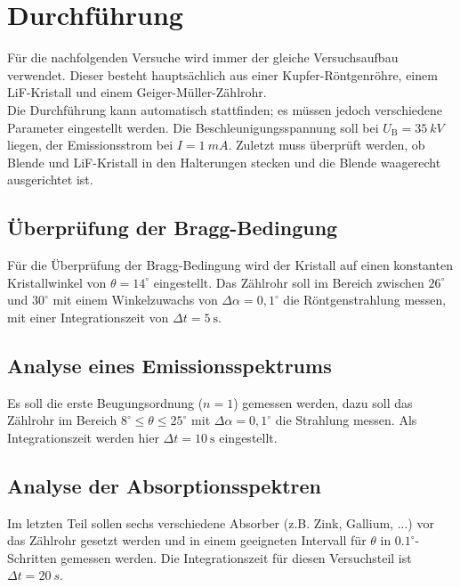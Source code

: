 \section{Durchführung}
\label{sec:Durchführung}
Für die nachfolgenden Versuche wird immer der gleiche Versuchsaufbau verwendet. Dieser
besteht hauptsächlich aus einer Kupfer-Röntgenröhre, einem LiF-Kristall und einem
Geiger-Müller-Zählrohr.
\\
Die Durchführung kann automatisch stattfinden; es müssen jedoch verschiedene Parameter
eingestellt werden. Die Beschleunigungsspannung soll bei $U_\text{B}=\SI{35}{kV}$ liegen,
der Emissionsstrom bei $I = \SI{1}{mA}$. 
Zuletzt muss überprüft werden, ob Blende und LiF-Kristall in
den Halterungen stecken und die Blende waagerecht ausgerichtet ist.

\subsection{Überprüfung der Bragg-Bedingung}
\label{sec:Überprüfung der Bragg-Bedingung}
Für die Überprüfung der Bragg-Bedingung wird der Kristall auf einen konstanten
Kristallwinkel von $\theta = 14^\circ$ eingestellt. Das Zählrohr soll im Bereich zwischen
$26^\circ$ und $30^\circ$ mit einem Winkelzuwachs von $\Delta \alpha = 0,1^\circ$ die
Röntgenstrahlung messen, mit einer Integrationszeit von $\Delta t = \SI{5}{\second}$.

\subsection{Analyse eines Emissionsspektrums}
\label{sec:Analyse eines Emissionsspektrums}
Es soll die erste Beugungsordnung ($n=1$) gemessen werden, dazu soll das Zählrohr im
Bereich $8^\circ \leq \theta \leq 25^\circ$ mit $\Delta \alpha = 0,1^\circ$ die Strahlung
messen. Als Integrationszeit werden hier $\Delta t = \SI{10}{\second}$ eingestellt.

\subsection{Analyse der Absorptionsspektren}
\label{sec:Analyse der Absorptionsspektren}
Im letzten Teil sollen sechs verschiedene Absorber (z.B. Zink, Gallium, ...) vor das
Zählrohr gesetzt werden und in einem geeigneten Intervall für $\theta$ in
$0.1^\circ$-Schritten gemessen werden. Die Integrationszeit für diesen Versuchsteil ist
$\Delta t = \SI{20}{s}$.

